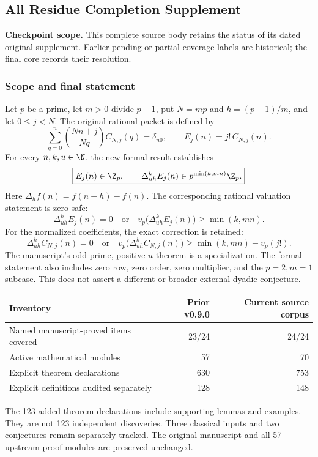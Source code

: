 \clearpage\subsection{All Residue Completion Supplement}\label{app:sup10}
\noindent\textbf{Checkpoint scope.} This complete source body retains the status of its dated original supplement. Earlier pending or partial-coverage labels are historical; the final core records their resolution.\par\medskip
\subsubsection*{Scope and final statement}
Let $p$ be a prime, let $m>0$ divide $p-1$, put $N=mp$ and $h=(p-1)/m$, and let $0\le j<N$. The original rational packet is defined by
\[
 \sum_{q=0}^{n}\binom{Nn+j}{Nq}C_{N,j}(q)=\delta_{n0},
 \qquad E_j(n)=j!\,C_{N,j}(n).
\]
For every $n,k,u\in\N$, the new formal result establishes
\[
 \boxed{E_j(n)\in\Z_p,\qquad
 \Delta_{uh}^{k}E_j(n)\in p^{\min(k,mn)}\Z_p.}
\]
Here $\Delta_h f(n)=f(n+h)-f(n)$. The corresponding rational valuation statement is zero-safe:
\[
 \Delta_{uh}^{k}E_j(n)=0\quad\text{or}\quad
 v_p\bigl(\Delta_{uh}^{k}E_j(n)\bigr)\ge\min(k,mn).
\]
For the normalized coefficients, the exact correction is retained:
\[
 \boxed{\Delta_{uh}^{k}C_{N,j}(n)=0\quad\text{or}\quad
 v_p\bigl(\Delta_{uh}^{k}C_{N,j}(n)\bigr)\ge\min(k,mn)-v_p(j!).}
\]
The manuscript's odd-prime, positive-$u$ theorem is a specialization. The formal statement also includes zero row, zero order, zero multiplier, and the $p=2,m=1$ subcase. This does not assert a different or broader external dyadic conjecture.

\begin{center}\begin{tabular}{lrr}\toprule
Inventory & Prior v0.9.0 & Current source corpus\\\midrule
Named manuscript-proved items covered &23/24&24/24\\
Active mathematical modules &57&70\\
Explicit theorem declarations &630&753\\
Explicit definitions audited separately &128&148\\\bottomrule
\end{tabular}\end{center}
The 123 added theorem declarations include supporting lemmas and examples. They are not 123 independent discoveries. Three classical inputs and two conjectures remain separately tracked. The original manuscript and all 57 upstream proof modules are preserved unchanged.

